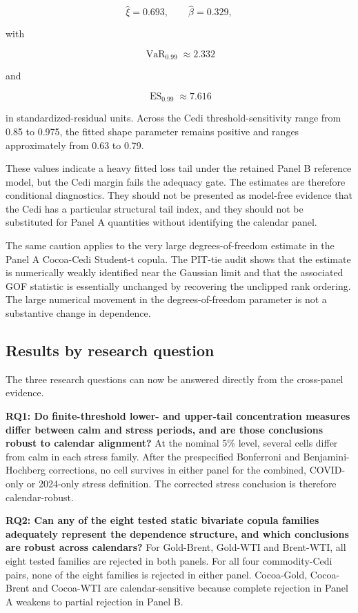 \[
\hat\xi=0.693,\qquad
\hat\beta=0.329,
\]

with

\[
\operatorname{VaR}_{0.99}\approx2.332
\]

and

\[
\operatorname{ES}_{0.99}\approx7.616
\]

in standardized-residual units. Across the Cedi threshold-sensitivity range from 0.85 to 0.975, the fitted shape parameter remains positive and ranges approximately from 0.63 to 0.79.

These values indicate a heavy fitted loss tail under the retained Panel B reference model, but the Cedi margin fails the adequacy gate. The estimates are therefore conditional diagnostics. They should not be presented as model-free evidence that the Cedi has a particular structural tail index, and they should not be substituted for Panel A quantities without identifying the calendar panel.

The same caution applies to the very large degrees-of-freedom estimate in the Panel A Cocoa-Cedi Student-t copula. The PIT-tie audit shows that the estimate is numerically weakly identified near the Gaussian limit and that the associated GOF statistic is essentially unchanged by recovering the unclipped rank ordering. The large numerical movement in the degrees-of-freedom parameter is not a substantive change in dependence.

\subsection{Results by research question}

The three research questions can now be answered directly from the cross-panel evidence.

\textbf{RQ1: Do finite-threshold lower- and upper-tail concentration measures differ between calm and stress periods, and are those conclusions robust to calendar alignment?}  
At the nominal 5\% level, several cells differ from calm in each stress family. After the prespecified Bonferroni and Benjamini-Hochberg corrections, no cell survives in either panel for the combined, COVID-only or 2024-only stress definition. The corrected stress conclusion is therefore calendar-robust.

\textbf{RQ2: Can any of the eight tested static bivariate copula families adequately represent the dependence structure, and which conclusions are robust across calendars?}  
For Gold-Brent, Gold-WTI and Brent-WTI, all eight tested families are rejected in both panels. For all four commodity-Cedi pairs, none of the eight families is rejected in either panel. Cocoa-Gold, Cocoa-Brent and Cocoa-WTI are calendar-sensitive because complete rejection in Panel A weakens to partial rejection in Panel B.

